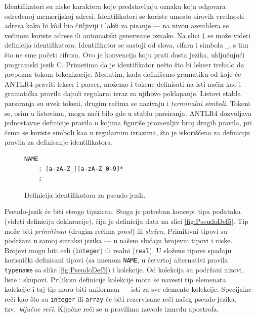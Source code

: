 Identifikatori su niske karaktera koje predstavljaju oznaku koja odgovara određenoj memorijskoj adresi. Identifikatori se koriste umesto sirovih vrednosti adresa kako bi k\^od bio čitljiviji i lakši za pisanje --- na nivou asemblera se većinom koriste adrese ili automatski generisane oznake. Na slici \ref{fig:PseudoDef4} se može videti definicija identifikatora. Identifikator se sastoji od slova, cifara i simbola \texttt{\_}, s tim što ne sme početi cifrom. Ovo je konvencija koju prati dosta jezika, uključujući programski jezik C. Primetimo da je identifikator nešto što bi lekser trebalo da prepozna tokom tokenizacije. Međutim, kada definišemo gramatiku od koje će ANTLR4 praviti lekser i parser, možemo i tokene definisati na isti način kao i gramatička pravila dajući regularni izraz za njihovo poklapanje. Listovi stabla parsiranja su uvek tokeni, drugim rečima se nazivaju i \emph{terminalni simboli}. Tokeni se, osim u listovima, mogu naći bilo gde u stablu parsiranja. ANTLR4 dozvoljava jednostavne definicije pravila u kojima figuriše promenljiv broj drugih pravila, pri čemu se koriste simboli kao u regularnim izrazima, što je iskorišćeno za definiciju pravila za definisanje identifikatora.

\begin{figure}[h!]
\begin{lstlisting}[language={}]
NAME
    : [a-zA-Z_][a-zA-Z_0-9]*
    ;
\end{lstlisting}
\caption{Definicija identifikatora za pseudo-jezik.}
\label{fig:PseudoDef4}
\end{figure}

Pseudo-jezik će biti strogo tipiziran. Stoga je potreban koncept tipa podataka (videti definiciju deklaracije), čija je definicija data na slici \ref{fig:PseudoDef5}. Tip može biti \emph{primitivan} (drugim rečima \emph{prost}) ili \emph{složen}. Primitivni tipovi su podržani u samoj sintaksi jezika --- u našem slučaju brojevni tipovi i niske. Brojevi mogu biti celi (\texttt{integer}) ili realni (\texttt{real}). U složene tipove spadaju korisnički definisani tipovi (sa imenom \texttt{NAME}, u četvrtoj alternativi pravila \texttt{typename} sa slike \ref{fig:PseudoDef5}) i kolekcije. Od kolekcija su podržani nizovi, liste i skupovi. Prilikom definicije kolekcije mora se navesti tip elemenata kolekcije i taj tip mora biti uniforman --- isti za sve elemente kolekcije. Specijalne reči kao što su \texttt{integer} ili \texttt{array} će biti rezervisane reči našeg pseudo-jezika, tzv.~\emph{ključne reči}. Ključne reči se u pravilima navode između apostrofa.

